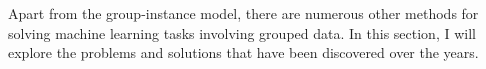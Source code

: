 \documentclass[../thesis.tex]{subfiles}
\begin{document}
Apart from the group-instance model, there are numerous other methods for solving machine learning tasks involving grouped data. In this section, I will explore the problems and solutions that have been discovered over the years.






\end{document}
